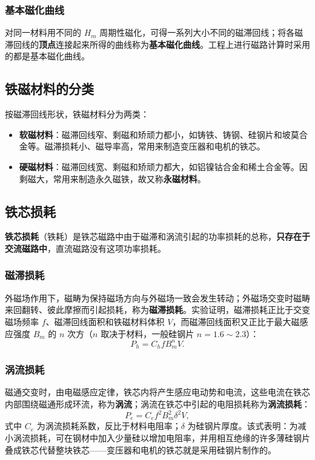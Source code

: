 \subsubsection{基本磁化曲线}
对同一材料用不同的 $H_m$ 周期性磁化，可得一系列大小不同的磁滞回线；将各磁滞回线的\textbf{顶点}连接起来所得的曲线称为\textbf{基本磁化曲线}。工程上进行磁路计算时采用的都是基本磁化曲线。

\subsection{铁磁材料的分类}
按磁滞回线形状，铁磁材料分为两类：
\begin{itemize}
  \item \textbf{软磁材料}：磁滞回线窄、剩磁和矫顽力都小，如铸铁、铸钢、硅钢片和坡莫合金等。磁滞损耗小、磁导率高，常用来制造变压器和电机的铁芯。
  \item \textbf{硬磁材料}：磁滞回线宽、剩磁和矫顽力都大，如铝镍钴合金和稀土合金等。因剩磁大，常用来制造永久磁铁，故又称\textbf{永磁材料}。
\end{itemize}

\subsection{铁芯损耗}
\textbf{铁芯损耗}（铁耗）是铁芯磁路中由于磁滞和涡流引起的功率损耗的总称，\textbf{只存在于交流磁路中}，直流磁路没有这项功率损耗。

\subsubsection{磁滞损耗}
外磁场作用下，磁畴为保持磁场方向与外磁场一致会发生转动；外磁场交变时磁畴来回翻转、彼此摩擦而引起损耗，称为\textbf{磁滞损耗}。实验证明，磁滞损耗正比于交变磁场频率 $f$、磁滞回线面积和铁磁材料体积 $V$，而磁滞回线面积又正比于最大磁感应强度 $B_m$ 的 $n$ 次方（$n$ 取决于材料，一般硅钢片 $n=1.6\sim2.3$）：
\begin{equation}
P_h=C_h f B_m^{n} V .
\end{equation}

\subsubsection{涡流损耗}
磁通交变时，由电磁感应定律，铁芯内将产生感应电动势和电流，这些电流在铁芯内部围绕磁通形成环流，称为\textbf{涡流}；涡流在铁芯中引起的电阻损耗称为\textbf{涡流损耗}：
\begin{equation}
P_e=C_e f^{2}B_m^{2}\delta^{2} V ,
\end{equation}
式中 $C_e$ 为涡流损耗系数，反比于材料电阻率；$\delta$ 为硅钢片厚度。该式表明：为减小涡流损耗，可在钢材中加入少量硅以增加电阻率，并用相互绝缘的许多薄硅钢片叠成铁芯代替整块铁芯——变压器和电机的铁芯就是采用硅钢片制作的。

